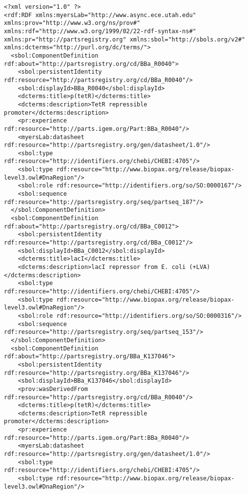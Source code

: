 \begin{minipage}{0.95\textwidth}
\begin{lstlisting}
<?xml version="1.0" ?>
<rdf:RDF xmlns:myersLab="http://www.async.ece.utah.edu" xmlns:prov="http://www.w3.org/ns/prov#" xmlns:rdf="http://www.w3.org/1999/02/22-rdf-syntax-ns#" xmlns:pr="http://partsregistry.org" xmlns:sbol="http://sbols.org/v2#" xmlns:dcterms="http://purl.org/dc/terms/">
  <sbol:ComponentDefinition rdf:about="http://partsregistry.org/cd/BBa_R0040">
    <sbol:persistentIdentity rdf:resource="http://partsregistry.org/cd/BBa_R0040"/>
    <sbol:displayId>BBa_R0040</sbol:displayId>
    <dcterms:title>p(tetR)</dcterms:title>
    <dcterms:description>TetR repressible promoter</dcterms:description>
    <pr:experience rdf:resource="http://parts.igem.org/Part:BBa_R0040"/>
    <myersLab:datasheet rdf:resource="http://partsregistry.org/gen/datasheet/1.0"/>
    <sbol:type rdf:resource="http://identifiers.org/chebi/CHEBI:4705"/>
    <sbol:type rdf:resource="http://www.biopax.org/release/biopax-level3.owl#DnaRegion"/>
    <sbol:role rdf:resource="http://identifiers.org/so/SO:0000167"/>
    <sbol:sequence rdf:resource="http://partsregistry.org/seq/partseq_187"/>
  </sbol:ComponentDefinition>
  <sbol:ComponentDefinition rdf:about="http://partsregistry.org/cd/BBa_C0012">
    <sbol:persistentIdentity rdf:resource="http://partsregistry.org/cd/BBa_C0012"/>
    <sbol:displayId>BBa_C0012</sbol:displayId>
    <dcterms:title>lacI</dcterms:title>
    <dcterms:description>lacI repressor from E. coli (+LVA)</dcterms:description>
    <sbol:type rdf:resource="http://identifiers.org/chebi/CHEBI:4705"/>
    <sbol:type rdf:resource="http://www.biopax.org/release/biopax-level3.owl#DnaRegion"/>
    <sbol:role rdf:resource="http://identifiers.org/so/SO:0000316"/>
    <sbol:sequence rdf:resource="http://partsregistry.org/seq/partseq_153"/>
  </sbol:ComponentDefinition>
  <sbol:ComponentDefinition rdf:about="http://partsregistry.org/BBa_K137046">
    <sbol:persistentIdentity rdf:resource="http://partsregistry.org/BBa_K137046"/>
    <sbol:displayId>BBa_K137046</sbol:displayId>
    <prov:wasDerivedFrom rdf:resource="http://partsregistry.org/cd/BBa_R0040"/>
    <dcterms:title>p(tetR)</dcterms:title>
    <dcterms:description>TetR repressible promoter</dcterms:description>
    <pr:experience rdf:resource="http://parts.igem.org/Part:BBa_R0040"/>
    <myersLab:datasheet rdf:resource="http://partsregistry.org/gen/datasheet/1.0"/>
    <sbol:type rdf:resource="http://identifiers.org/chebi/CHEBI:4705"/>
    <sbol:type rdf:resource="http://www.biopax.org/release/biopax-level3.owl#DnaRegion"/>

\end{lstlisting}
\end{minipage}
